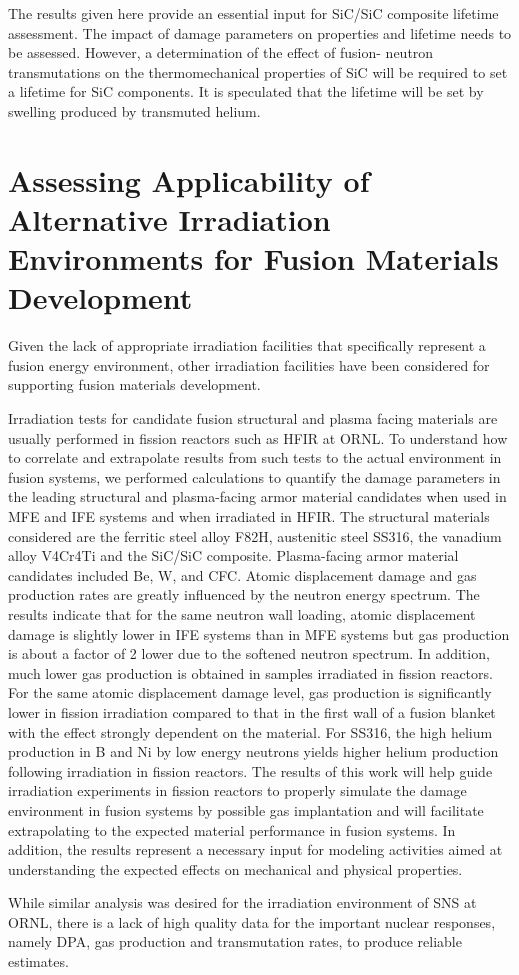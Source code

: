 The results given here provide an essential input for SiC/SiC composite
lifetime assessment. The impact of damage parameters on properties and
lifetime needs to be assessed. However, a determination of the effect of
fusion- neutron transmutations on the thermomechanical properties of SiC will
be required to set a lifetime for SiC components. It is speculated that the
lifetime will be set by swelling produced by transmuted
helium.

\section{Assessing Applicability of Alternative Irradiation Environments for Fusion Materials Development}

Given the lack of appropriate irradiation facilities that specifically
represent a fusion energy environment, other irradiation facilities have been
considered for supporting fusion materials development.

Irradiation tests for candidate fusion structural and plasma facing materials
are usually performed in fission reactors such as \gls{HFIR} at \gls{ORNL}. To
understand how to correlate and extrapolate results from such tests to the
actual environment in fusion systems, we performed calculations to quantify
the damage parameters in the leading structural and plasma-facing armor
material candidates when used in \gls{MFE} and \gls{IFE} systems and when
irradiated in \gls{HFIR}. The structural materials considered are the ferritic
steel alloy F82H, austenitic steel SS316, the vanadium alloy V4Cr4Ti and the
SiC/SiC composite. Plasma-facing armor material candidates included Be, W, and
\gls{CFC}.  Atomic displacement damage and gas production rates are greatly
influenced by the neutron energy spectrum. The results indicate that for the
same neutron wall loading, atomic displacement damage is slightly lower in
\gls{IFE} systems than in \gls{MFE} systems but gas production is about a
factor of 2 lower due to the softened neutron spectrum. In addition, much
lower gas production is obtained in samples irradiated in fission
reactors. For the same atomic displacement damage level, gas production is
significantly lower in fission irradiation compared to that in the first wall
of a fusion blanket with the effect strongly dependent on the material. For
SS316, the high helium production in B and Ni by low energy neutrons yields
higher helium production following irradiation in fission reactors. The
results of this work will help guide irradiation experiments in fission
reactors to properly simulate the damage environment in fusion systems by
possible gas implantation and will facilitate extrapolating to the expected
material performance in fusion systems. In addition, the results represent a
necessary input for modeling activities aimed at understanding the expected
effects on mechanical and physical properties.

While similar analysis was desired for the irradiation environment of
\gls{SNS} at \gls{ORNL}, there is a lack of high quality data for the
important nuclear responses, namely DPA, gas production and transmutation
rates, to produce reliable estimates.







